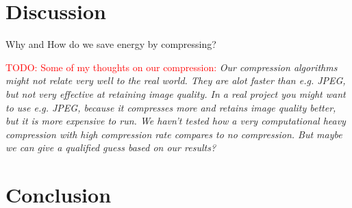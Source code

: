 \section{Discussion}
Why and How do we save energy by compressing?


\textcolor{red}{TODO: Some of my thoughts on our compression:}
\textit{Our compression algorithms might not relate very well to the real world.
They are alot faster than e.g. JPEG, but not very effective at retaining image quality.
In a real project you might want to use e.g. JPEG, because it compresses more and retains image quality better, but it is more expensive to run.
We havn't tested how a very computational heavy compression with high compression rate compares to no compression.
But maybe we can give a qualified guess based on our results?}

\section{Conclusion}